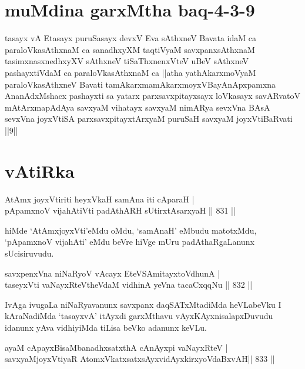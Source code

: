 
\section*{muMdina garxMtha baq-4-3-9}

\begin{shl}
tasayx vA Etasayx puruSasayx devxV Eva sAthxneV Bavata idaM ca paraloVkasAthxnaM ca sanadhxyXM taqtiVyaM savxpanxsAthxnaM tasimxnasxnedhxyXV sAthxneV tiSaThxnenxVteV uBeV sAthxneV pashayxtiVdaM ca paraloVkasAthxnaM ca ||atha yathAkarxmoV\s yaM paraloVkasAthxneV Bavati tamAkarxmamAkarxmoyxVBayAnApxpamxna AnanAdxMshacx pashayxti sa yatarx parxsavxpitayxsayx loVkasayx savARvatoV mAtArxmapAdAya savxyaM vihatayx savxyaM nimARya sevxVna BAsA sevxVna joyxVtiSA parxsavxpitayxtArxyaM puruSaH savxyaM joyxVtiBaRvati ||9||
\end{shl}

\section*{vAtiRka}


\begin{shl}
AtAmx joyxVtiriti heyxVkaH samAna iti cAparaH | \\
pApamxnoV vijahAtiVti padAthARH sUtirxtAsarxyaH \hfill||  831 ||  
\end{shl}

\begin{artha}
hiMde `AtAmxjoyxVti'eMdu oMdu, `samAnaH' eMbudu matotxMdu, `pApamxnoV vijahAti' eMdu beVre hiVge mUru padAthaRgaLanunx sUcisiruvudu.
\end{artha}

\begin{shl}
savxpenxVna niNaRyoV vAcayx EteVSAmitayxtoV\s dhunA | \\
taseyxVti vaNayxRteV\s theVdaM vidhinA yeVna tacaCxqqNu \hfill||  832 ||  
\end{shl}

\begin{artha}
IvAga ivugaLa niNaRyavanunx savxpanx daqSATxMtadiMda heVLabeVku I kAraNadiMda `tasayxvA' itAyxdi garxMthavu vAyxKAyxnisalapxDuvudu idanunx yAva vidhiyiMda tiLisa beVko adanunx keVLu.
\end{artha}

\begin{shl}
ayaM cApayxBisaMbanadhxsatxthA cAnAyx\s pi vaNayxRteV | \\
savxyaMjoyxVtiyaR AtomxVkatxsatxsAyxvidAyxkirxyoVdaBxvAH\hfill ||  833 ||  
\end{shl}
				
